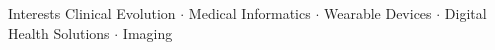 \begin{rubric}{Interests}
Clinical Evolution $\cdot$ Medical Informatics  $\cdot$ Wearable Devices $\cdot$ Digital Health Solutions $\cdot$ Imaging \\
\end{rubric}